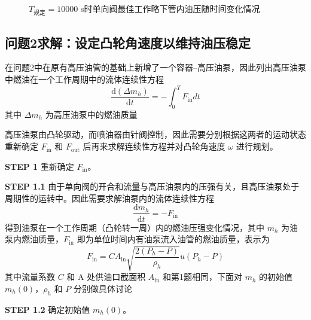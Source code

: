 \documentclass[12pt,a4paper]{article}
\begin{document}
\begin{figure}[htbp]
\begin{minipage}[t]{0.48\textwidth}
\caption{$T_{\text{规定}}=10000$ s时单向阀最佳工作略下管内油压随时间变化情况}\label{Problem_1_2_P_t_10s}
\end{minipage}
\end{figure}

\subsection{问题2求解：设定凸轮角速度以维持油压稳定}
在问题2中在原有高压油管的基础上新增了一个容器--高压油泵，因此列出高压油泵中燃油在一个工作周期中的流体连续性方程
\begin{equation}
\label{cntequ_h}
\frac{\text{d}(\Delta m_h)}{\text{d}t}=-\int_0^TF_{\text{in}}dt
\end{equation}
其中 $\Delta m_h$ 为高压油泵中的燃油质量

高压油泵由凸轮驱动，而喷油器由针阀控制，因此需要分别根据这两者的运动状态重新确定 $F_{\text{in}}$ 和 $F_{\text{out}}$ 后再来求解连续性方程并对凸轮角速度 $\omega$ 进行规划。

\textbf{\songti STEP 1} 重新确定 $F_{\text{in}}$。

\textbf{\songti STEP 1.1} 由于单向阀的开合和流量与高压油泵内的压强有关，且高压油泵处于周期性的运转中。因此需要求解油泵内的流体连续性方程
\begin{equation}
\frac{\text{d}m_h}{\text{d}t}=-F_{\text{in}}
\end{equation}
得到油泵在一个工作周期（凸轮转一周）内的燃油压强变化情况，其中 $m_h$ 为油泵内燃油质量，$F_{\text{in}}$ 即为单位时间内有油泵流入油管的燃油质量，表示为
\begin{equation}
\label{cntequ3}
F_{\text{in}}=CA_{\text{in}}\sqrt{\frac{2(P_h-P)}{\rho_h}}u(P_h-P)
\end{equation}
其中流量系数 $C$ 和 A 处供油口截面积 $A_{\text{in}}$ 和第1题相同，下面对 $m_h$ 的初始值 $m_h(0)$，$\rho_h$ 和 $P$ 分别做具体讨论

\textbf{\songti STEP 1.2} 确定初始值 $m_h(0)$。
\end{document}
